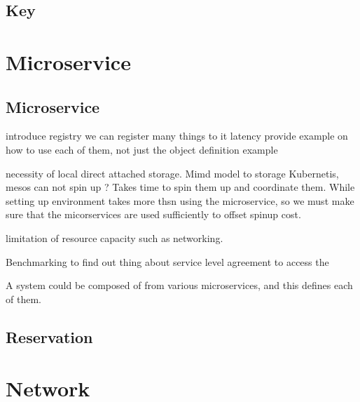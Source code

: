 \documentclass[9pt,twocolumn,twoside]{styles/osajnl}
\begin{document}
\subsection{Key}


\section{Microservice}

\subsection{Microservice}

 
introduce registry we can register many things to it 
latency 
provide example on how to use each of them, not just the object definition example 
 
necessity of local direct attached storage. 
Mimd model to storage  
Kubernetis, mesos can not spin up ?  
Takes time to spin them up and coordinate them. While setting up environment takes more thsn using the microservice, so we must make sure that the micorservices are used sufficiently to offset spinup cost. 
 
limitation of resource capacity such as networking. 
 
Benchmarking to find out thing about service level agreement to access
the 


A system could be composed of from various microservices, and this defines
each of them.



\subsection{Reservation}


\section{Network}
\end{document}
